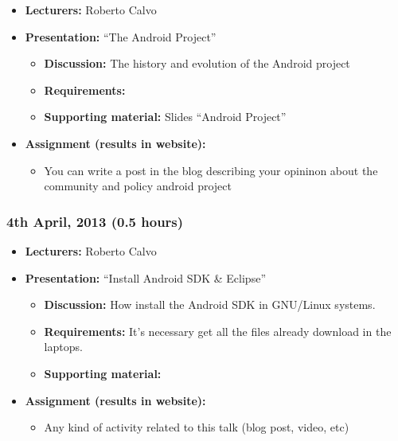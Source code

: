 \documentclass[a4paper]{article}
\begin{document}
\begin{itemize}
\item \textbf{Lecturers:} Roberto Calvo
\item \textbf{Presentation:} ``The Android Project''
  \begin{itemize}
  \item \textbf{Discussion:} The history and evolution of the Android
    project
  \item \textbf{Requirements:} 
  \item \textbf{Supporting material:} Slides ``Android Project''
  \end{itemize}
\item \textbf{Assignment (results in website):}
  \begin{itemize}
  \item You can write a post in the blog describing your opininon
    about the community and policy android project
  \end{itemize}
\end{itemize}


\subsubsection{4th April, 2013 (0.5 hours)}

\begin{itemize}
\item \textbf{Lecturers:} Roberto Calvo
\item \textbf{Presentation:} ``Install Android SDK \& Eclipse''
  \begin{itemize}
  \item \textbf{Discussion:} How install the Android SDK in GNU/Linux
    systems.
  \item \textbf{Requirements:} It's necessary get all the files
    already download in the laptops.
  \item \textbf{Supporting material:}
  \end{itemize}
\item \textbf{Assignment (results in website):}
  \begin{itemize}
  \item Any kind of activity
    related to this talk (blog post, video, etc)
  \end{itemize}
\end{itemize}
\end{document}
